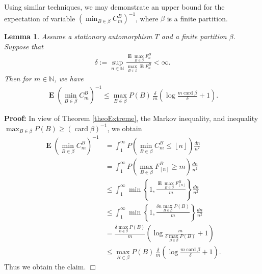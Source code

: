 \documentclass[a4paper,12pt]{article}
\newcommand{\okra}[1]{\left( #1 \right)}
\newcommand{\klam}[1]{\left\{ #1 \right\}}
\newcommand{\floor}[1]{\left\lfloor #1 \right\rfloor}
\DeclareMathOperator{\card}{card}
\DeclareMathOperator{\mean}{\mathbf{E}}
\newtheorem{lemma}{Lemma}
\newenvironment*{proof}{\begin{trivlist}\item[]
\noindent\textbf{Proof:}}{$\Box$\par\end{trivlist}}
\begin{document}
Using similar techniques, we may demonstrate an upper bound for the
expectation of variable $\okra{\min_{B\in\beta} C^B_m}^{-1}$, where $\beta$
is a finite partition.
\begin{lemma}
  \label{theoMaxBounded}
  Assume a stationary automorphism $T$ and a finite partition $\beta$.
  Suppose that
  \begin{align}
    \delta:=
    \sup_{n\in\mathbb{N}}\frac{\mean\max_{B\in\beta}
    F^B_n}{\max_{B\in\beta}\mean F^B_n}<\infty.
  \end{align}
  Then for $m\in\mathbb{N}$, we have
  \begin{align}
    \mean \okra{\min_{B\in\beta} C^B_m}^{-1}\le
    \max_{B\in\beta} P(B)\, \frac{\delta}{m}\okra{
    \log\frac{m\card\beta}{\delta}+1
    }
    .
  \end{align}
\end{lemma}
\begin{proof}
  In view of Theorem \ref{theoExtreme}, the Markov inequality, and
  inequality $\max_{B\in\beta} P(B)\ge (\card\beta)^{-1}$, we obtain
  \begin{align}
    \mean \okra{\min_{B\in\beta} C^B_m}^{-1}
    &=
      \int_1^\infty P\okra{\min_{B\in\beta} C^B_m\le \floor{n}} \frac{dn}{n^2}
      \nonumber\\
    &=
      \int_1^\infty P\okra{\max_{B\in\beta} F^B_{\floor{n}}\ge m} \frac{dn}{n^2}
      \nonumber\\
    &\le \int_1^\infty \min\klam{1,\frac{\mean\max_{B\in\beta}
      F^B_{\floor{n}}}{m}} \frac{dn}{n^2}
      \nonumber\\
    &\le \int_1^\infty \min\klam{1,\frac{\delta n\max_{B\in\beta}
      P(B)}{m}} \frac{dn}{n^2}
      \nonumber\\
    &= \frac{\delta \max_{B\in\beta}
      P(B)}{m}\okra{\log\frac{m}{\delta \max_{B\in\beta}
      P(B)}+1}
      \nonumber\\
    &\le \max_{B\in\beta} P(B)\, \frac{\delta}{m}\okra{
      \log\frac{m\card\beta}{\delta}+1
      }
      .
  \end{align}
  Thus we obtain the claim.
\end{proof}
\end{document}
